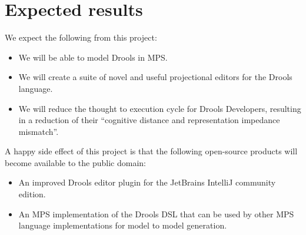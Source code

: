 \section{Expected results} 

We expect the following from this project:
\begin{itemize}
    \item We will be able to model Drools in MPS.
    \item We will create a suite of novel and useful projectional editors for the Drools language.
    \item We will reduce the thought to execution cycle for Drools Developers, resulting in a reduction of their ``cognitive distance and representation impedance mismatch''\cite{live_literals}.
\end{itemize}

A happy side effect of this project is that the following open-source products will become available to the public domain:
\begin{itemize}
    \item An improved Drools editor plugin for the JetBrains IntelliJ community edition.
	\item An MPS implementation of the Drools DSL that can be used by other MPS language implementations for model to model generation.
\end{itemize}

